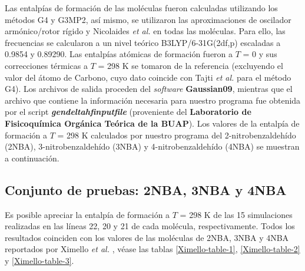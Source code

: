 Las entalpías de formación de las moléculas fueron calculadas utilizando los métodos G4 y G3MP2, así mismo, se utilizaron las aproximaciones de oscilador armónico/rotor rígido \cite{McQuarrie1976} y Nicolaides \textit{et al.}\cite{Nicolaides1996} en todas las moléculas. Para ello, las frecuencias se calcularon a un nivel teórico B3LYP/6-31G(2df,p) escaladas a 0.9854 y 0.89290. Las entalpías atómicas de formación  fueron a $T$ = 0 y sus correcciones térmicas a $T$ = 298 K se tomaron de la referencia \cite{NIST1998} (excluyendo el valor del átomo de Carbono, cuyo dato coincide con Tajti \textit{et al.} \cite{Tajti2004} para el método G4). Los archivos de salida proceden del \textit{software} \textbf{Gaussian09}, mientras que el archivo que contiene la información necesaria para nuestro programa fue obtenida por el script \textbf{\textit{gendeltahfinputfile}} (proveniente del \textbf{Laboratorio de Fisicoquímica Orgánica Teórica de la BUAP}). Los valores de la entalpía de formación a $T$ = 298 K calculados por nuestro programa del 2-nitrobenzaldehído (2NBA), 3-nitrobenzaldehído (3NBA) y 4-nitrobenzaldehído (4NBA) se muestran a continuación.

\subsection{Conjunto de pruebas: 2NBA, 3NBA y 4NBA}

Es posible apreciar la entalpía de formación a $T$ = 298 K de las 15 simulaciones realizadas en las líneas 22, 20 y 21 de cada molécula, respectivamente. Todos los resultados coinciden con los valores de las moléculas de 2NBA, 3NBA y 4NBA reportados por Ximello \textit{et al.} \cite{Ximello2020}, véase las tablas \ref{Ximello-table-1}, \ref{Ximello-table-2} y \ref{Ximello-table-3}.  

\newpage

